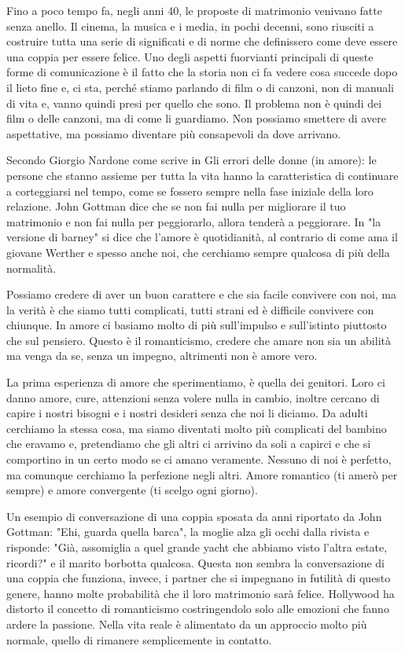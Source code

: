\documentclass[12pt]{book} %
\begin{document}
Fino a poco tempo fa, negli anni 40, le proposte di matrimonio venivano fatte senza anello. Il
cinema, la musica e i media, in pochi decenni, sono riusciti a costruire tutta una serie di significati e di norme che
definissero come deve essere una coppia per essere felice. Uno degli aspetti fuorvianti principali di queste forme di
comunicazione è il fatto che la storia non ci fa vedere cosa succede dopo il lieto fine e, ci sta, perché stiamo
parlando di film o di canzoni, non di manuali di vita e, vanno quindi presi per quello che sono. Il problema non è
quindi dei film o delle canzoni, ma di come li guardiamo. Non possiamo smettere di avere aspettative, ma possiamo
diventare più consapevoli da dove arrivano.

Secondo Giorgio Nardone come scrive in Gli errori delle donne (in amore): le persone
che stanno assieme per tutta la vita hanno la caratteristica di continuare a corteggiarsi nel tempo, come se fossero
sempre nella fase iniziale della loro relazione. John Gottman dice che se non fai nulla per migliorare il tuo
matrimonio e non fai nulla per peggiorarlo, allora tenderà a peggiorare.
In "la versione di barney" si dice che l'amore è quotidianità, al contrario di come ama il giovane Werther e spesso anche noi, che cerchiamo sempre qualcosa di più della normalità.

Possiamo credere di aver un buon carattere e che sia facile convivere con noi, ma la verità è che siamo tutti
complicati, tutti strani ed è difficile convivere con chiunque. In amore ci basiamo molto di più sull'impulso e
sull'istinto piuttosto che sul pensiero. Questo è il romanticismo, credere che amare non sia un abilità ma venga da se,
senza un impegno, altrimenti non è amore vero.

La prima esperienza di amore che sperimentiamo, è quella dei genitori. Loro ci danno amore, cure, attenzioni senza
volere nulla in cambio, inoltre cercano di capire i nostri bisogni e i nostri desideri senza che noi li diciamo. Da
adulti cerchiamo la stessa cosa, ma siamo diventati molto più complicati del bambino che eravamo e, pretendiamo che
gli altri ci arrivino da soli a capirci e che si comportino in un certo modo se ci amano veramente. Nessuno di noi è
perfetto, ma comunque cerchiamo la perfezione negli altri. Amore romantico (ti amerò per sempre) e amore convergente (ti scelgo ogni giorno).

Un esempio di conversazione di una coppia sposata da anni riportato da John Gottman: "Ehi, guarda
quella barca", la moglie alza gli occhi dalla rivista e risponde: "Già,
assomiglia a quel grande yacht che abbiamo visto l'altra estate, ricordi?" e
il marito borbotta qualcosa. Questa non sembra la conversazione di una coppia che funziona, invece, i partner che si
impegnano in futilità di questo genere, hanno molte probabilità che il loro matrimonio sarà felice.
Hollywood ha distorto il concetto di romanticismo costringendolo solo alle emozioni che fanno ardere la passione. Nella
vita reale è alimentato da un approccio molto più normale, quello di rimanere semplicemente in contatto. 
\end{document}
